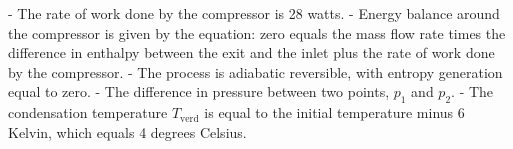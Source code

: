 - The rate of work done by the compressor is 28 watts.
- Energy balance around the compressor is given by the equation: zero equals the mass flow rate times the difference in enthalpy between the exit and the inlet plus the rate of work done by the compressor.
- The process is adiabatic reversible, with entropy generation equal to zero.
- The difference in pressure between two points, \( p_1 \) and \( p_2 \).
- The condensation temperature \( T_{\text{verd}} \) is equal to the initial temperature minus 6 Kelvin, which equals 4 degrees Celsius.
